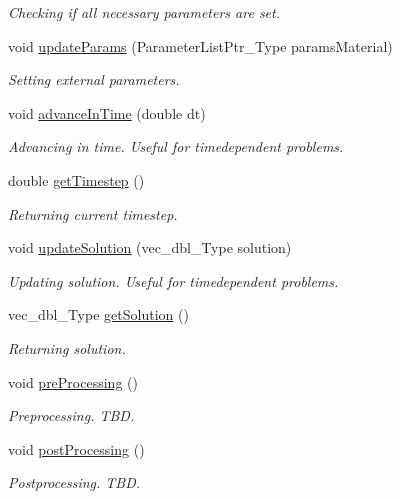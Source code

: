 \begin{DoxyCompactItemize}
\begin{DoxyCompactList}\small\item\em Checking if all necessary parameters are set. \end{DoxyCompactList}\item 
void \hyperlink{classFEDD_1_1AssembleFE_af15eff2c9207ac4c3994a4cfb5a0a7fd}{update\+Params} (Parameter\+List\+Ptr\+\_\+\+Type params\+Material)
\begin{DoxyCompactList}\small\item\em Setting external parameters. \end{DoxyCompactList}\item 
void \hyperlink{classFEDD_1_1AssembleFE_aa291b30d2a3f78705b2a7722a1a04d96}{advance\+In\+Time} (double dt)
\begin{DoxyCompactList}\small\item\em Advancing in time. Useful for timedependent problems. \end{DoxyCompactList}\item 
double \hyperlink{classFEDD_1_1AssembleFE_ab6cc0ce0c63df078ee4b6d93b93d928d}{get\+Timestep} ()
\begin{DoxyCompactList}\small\item\em Returning current timestep. \end{DoxyCompactList}\item 
void \hyperlink{classFEDD_1_1AssembleFE_a5303adf0752fe27d9ff47ae8a39c1da4}{update\+Solution} (vec\+\_\+dbl\+\_\+\+Type solution)
\begin{DoxyCompactList}\small\item\em Updating solution. Useful for timedependent problems. \end{DoxyCompactList}\item 
vec\+\_\+dbl\+\_\+\+Type \hyperlink{classFEDD_1_1AssembleFE_a33e83a1eb6656a74609dfbfaf3fae474}{get\+Solution} ()
\begin{DoxyCompactList}\small\item\em Returning solution. \end{DoxyCompactList}\item 
\mbox{\label{classFEDD_1_1AssembleFE_a7bfb3f6b49f102b0856551d62c8c8a9f}} 
void \hyperlink{classFEDD_1_1AssembleFE_a7bfb3f6b49f102b0856551d62c8c8a9f}{pre\+Processing} ()
\begin{DoxyCompactList}\small\item\em Preprocessing. T\+BD. \end{DoxyCompactList}\item 
\mbox{\label{classFEDD_1_1AssembleFE_a8ae32f71020082d81b055afbeda6fc29}} 
void \hyperlink{classFEDD_1_1AssembleFE_a8ae32f71020082d81b055afbeda6fc29}{post\+Processing} ()
\begin{DoxyCompactList}\small\item\em Postprocessing. T\+BD. \end{DoxyCompactList}\end{DoxyCompactItemize}



